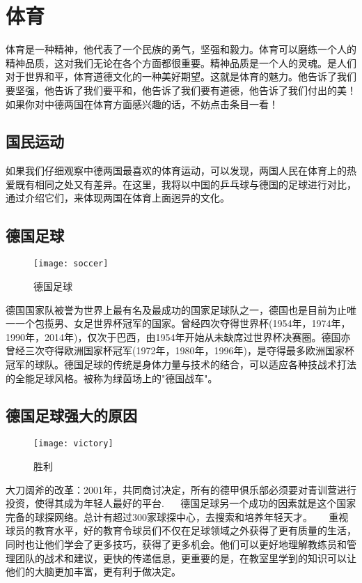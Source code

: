 \section{体育}
    体育是一种精神，他代表了一个民族的勇气，坚强和毅力。体育可以磨练一个人的精神品质，这对我们无论在各个方面都很重要。精神品质是一个人的灵魂。是人们对于世界和平，体育道德文化的一种美好期望。这就是体育的魅力。他告诉了我们要坚强，他告诉了我们要平和，他告诉了我们要有道德，他告诉了我们付出的美！如果你对中德两国在体育方面感兴趣的话，不妨点击条目一看！

\subsection{国民运动}
    如果我们仔细观察中德两国最喜欢的体育运动，可以发现，两国人民在体育上的热爱既有相同之处又有差异。在这里，我将以中国的乒乓球与德国的足球进行对比，通过介绍它们，来体现两国在体育上面迥异的文化。

\subsection{德国足球}
\begin{figure}[htb]
    \centering
    \texttt{[image: soccer]}
    \caption{德国足球}
\end{figure}

    德国国家队被誉为世界上最有名及最成功的国家足球队之一，德国也是目前为止唯一一个包揽男、女足世界杯冠军的国家。曾经四次夺得世界杯(1954年，1974年，1990年，2014年)，仅次于巴西，由1954年开始从未缺席过世界杯决赛圈。德国亦曾经三次夺得欧洲国家杯冠军(1972年，1980年，1996年)，是夺得最多欧洲国家杯冠军的球队。德国足球的传统是身体力量与技术的结合，可以适应各种技战术打法的全能足球风格。被称为绿茵场上的"德国战车"。 

\subsection{德国足球强大的原因}
\begin{figure}[htb]
    \centering
    \texttt{[image: victory]}
    \caption{胜利}
\end{figure}

    大刀阔斧的改革：2001年，共同商讨决定，所有的德甲俱乐部必须要对青训营进行投资，使得其成为年轻人最好的平台. 
    
    德国足球另一个成功的因素就是这个国家完备的球探网络。总计有超过300家球探中心，去搜索和培养年轻天才。 
    
    重视球员的教育水平，好的教育令球员们不仅在足球领域之外获得了更有质量的生活，同时也让他们学会了更多技巧，获得了更多机会。他们可以更好地理解教练员和管理团队的战术和建议，更快的传递信息，更重要的是，在教室里学到的知识可以让他们的大脑更加丰富，更有利于做决定。 

